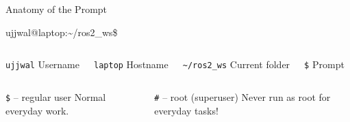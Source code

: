 \documentclass[aspectratio=169]{beamer}
\begin{document}
\begin{frame}{Anatomy of the Prompt}
  \begin{center}
    {\ttfamily\large
      ujjwal\alert{@}laptop\alert{:}\textasciitilde/ros2\_ws\alert{\$}}
  \end{center}
  \vspace{0.6em}
  \begin{columns}
      \begin{block}{\texttt{ujjwal}}
        \centering Username
      \end{block}
      \begin{block}{\texttt{laptop}}
        \centering Hostname
      \end{block}
      \begin{exampleblock}{\texttt{\textasciitilde/ros2\_ws}}
        \centering Current folder
      \end{exampleblock}
      \begin{alertblock}{\texttt{\$}}
        \centering Prompt
      \end{alertblock}
  \end{columns}
  \vspace{0.5em}
  \begin{columns}
      \begin{block}{\texttt{\$} -- regular user}
        Normal everyday work.
      \end{block}
      \begin{alertblock}{\texttt{\#} -- root (superuser)}
        Never run as root for everyday tasks!
      \end{alertblock}
  \end{columns}
\end{frame}
\end{document}
